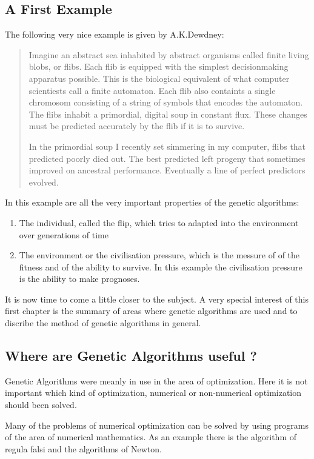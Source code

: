 \subsection{A First Example}
The following very nice example is given by A.K.Dewdney:
\begin{quotation}
Imagine an abstract sea inhabited by abstract organisms called
finite living blobs, or flibs. Each flib is equipped with the simplest decisionmaking
apparatus possible. This is the biological equivalent of what computer scientiests
call a finite automaton. Each flib also containts a single chromosom consisting
of a string of symbols that encodes the automaton. The flibs inhabit a primordial,
digital soup in constant flux. These changes must be predicted accurately by the
flib if it is to survive.

In the primordial soup I recently set simmering in my computer, flibs that predicted
poorly died out. The best predicted left progeny that sometimes improved on ancestral
performance. Eventually a line of perfect predictors evolved.\cite{Dew85}
\end{quotation}
In this example are all the very important properties of the genetic algorithms:
\begin{enumerate}
  \item The individual, called the flip, which tries to adapted into the environment
over generations of time
  \item The environment or the civilisation pressure, which is the messure of
of the fitness and of the ability to survive. In this example the civilisation
pressure is the ability to make prognoses.
\end{enumerate}
It is now time to come a little closer to the subject. A very special interest
of this first chapter is the summary of areas where genetic algorithms are used
and to discribe the method of genetic algorithms in general.
\subsection{Where are Genetic Algorithms useful ?}
Genetic Algorithms were meanly in use in the area of optimization. Here it is not
important which kind of optimization, numerical or non-numerical optimization
should been solved.

Many of the problems of numerical optimization can be solved by using programs
of the area of numerical mathematics. As an example there is the algorithm of
regula falsi and the algorithms of Newton\cite{Pre89}.

